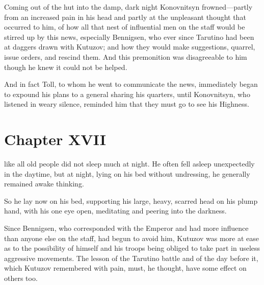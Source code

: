 Coming out of the hut into the damp, dark night Konovnitsyn
frowned---partly from an increased pain in his head and partly at
the unpleasant thought that occurred to him, of how all that nest
of influential men on the staff would be stirred up by this news,
especially Bennigsen, who ever since Tarutino had been at daggers
drawn with Kutuzov; and how they would make suggestions, quarrel,
issue orders, and rescind them. And this premonition was
disagreeable to him though he knew it could not be helped.

And in fact Toll, to whom he went to communicate the news,
immediately began to expound his plans to a general sharing his
quarters, until Konovnitsyn, who listened in weary silence,
reminded him that they must go to see his Highness.


\chapter*{Chapter XVII} \ifaudio {}
\fi

 like all old people did not sleep much at night. He often
fell asleep unexpectedly in the daytime, but at night, lying on
his bed without undressing, he generally remained awake thinking.

So he lay now on his bed, supporting his large, heavy, scarred
head on his plump hand, with his one eye open, meditating and
peering into the darkness.

Since Bennigsen, who corresponded with the Emperor and had more
influence than anyone else on the staff, had begun to avoid him,
Kutuzov was more at ease as to the possibility of himself and his
troops being obliged to take part in useless aggressive
movements. The lesson of the Tarutino battle and of the day
before it, which Kutuzov remembered with pain, must, he thought,
have some effect on others too.

